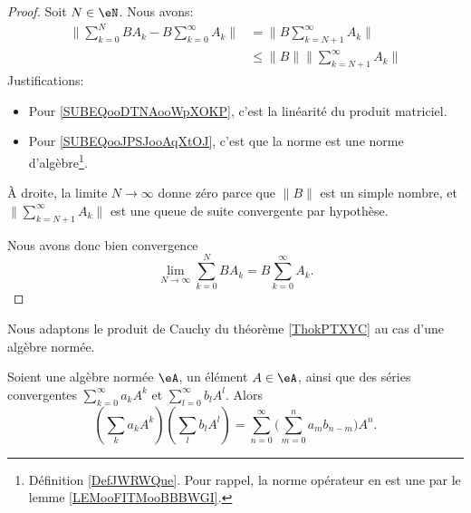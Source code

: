 \begin{proof}
    Soit \( N\in \eN\). Nous avons:
    \begin{subequations}
        \begin{align}
            \| \sum_{k=0}^NBA_k-B\sum_{k=0}^{\infty}A_k \|&=\| B\sum_{k=N+1}^{\infty}A_k \| \label{SUBEQooDTNAooWpXOKP}\\
            &\leq \| B \|\| \sum_{k=N+1}^{\infty}A_k \|     \label{SUBEQooJPSJooAqXtOJ}
        \end{align}
    \end{subequations}
    Justifications:
    \begin{itemize}
        \item Pour \eqref{SUBEQooDTNAooWpXOKP}, c'est la linéarité du produit matriciel.
        \item Pour \eqref{SUBEQooJPSJooAqXtOJ}, c'est que la norme est une norme d'algèbre\footnote{Définition \ref{DefJWRWQue}. Pour rappel, la norme opérateur en est une par le lemme \ref{LEMooFITMooBBBWGI}.}.
    \end{itemize}
    À droite, la limite \( N\to \infty\) donne zéro parce que \( \| B \|\) est un simple nombre, et \( \| \sum_{k=N+1}^{\infty}A_k \|\) est une queue de suite convergente par hypothèse.

    Nous avons donc bien convergence
    \begin{equation}
        \lim_{N\to \infty}\sum_{k=0}^{N}BA_k=B\sum_{k=0}^{\infty}A_k.
    \end{equation}
\end{proof}

Nous adaptons le produit de Cauchy du théorème \ref{ThokPTXYC} au cas d'une algèbre normée.
\begin{proposition}      \label{PROPooFMEXooCNjdhS}
    Soient une algèbre normée \( \eA\), un élément \( A\in \eA\), ainsi que des séries convergentes \( \sum_{k=0}^{\infty}a_kA^k\) et \( \sum_{l=0}^{\infty}b_lA^l\). Alors
    \begin{equation}
        \left( \sum_ka_kA^k \right)\left( \sum_lb_lA^l \right)=\sum_{n=0}^{\infty}\big( \sum_{m=0}^na_mb_{n-m} \big)A^n.
    \end{equation}
\end{proposition}

